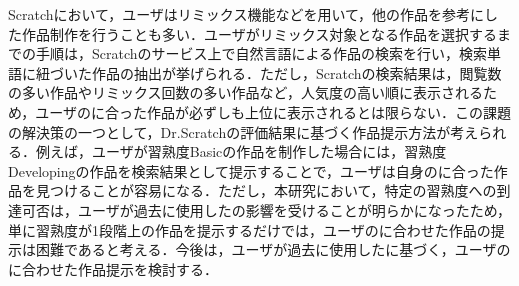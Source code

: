 \documentclass[submit]{ipsj}
\begin{document}
Scratchにおいて，ユーザはリミックス機能などを用いて，他の作品を参考にした作品制作を行うことも多い．ユーザがリミックス対象となる作品を選択するまでの手順は，Scratchのサービス上で自然言語による作品の検索を行い，検索単語に紐づいた作品の抽出が挙げられる．ただし，Scratchの検索結果は，閲覧数の多い作品やリミックス回数の多い作品など，人気度の高い順に表示されるため，ユーザの\textcolor{red}{}に合った作品が必ずしも上位に表示されるとは限らない．この課題の解決策の一つとして，Dr.Scratchの評価結果に基づく作品提示方法が考えられる．例えば，ユーザが習熟度Basicの作品を制作した場合には，習熟度Developingの作品を検索結果として提示することで，ユーザは自身の\textcolor{red}{}に合った作品を見つけることが容易になる．ただし，本研究において，特定の習熟度への到達可否は，ユーザが過去に使用した\textcolor{red}{}の影響を受けることが明らかになったため，単に習熟度が1段階上の作品を提示するだけでは，ユーザの\textcolor{red}{}に合わせた作品の提示は困難であると考える．\textcolor{red}{}今後は，ユーザが過去に使用した\textcolor{red}{}に基づく，ユーザの\textcolor{red}{}に合わせた作品提示を検討する．
\end{document}
